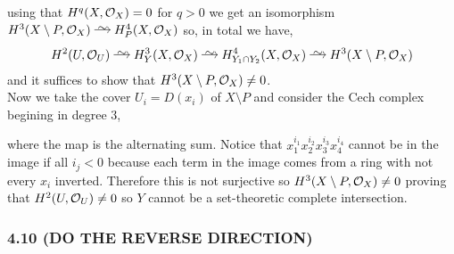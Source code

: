 \documentclass[12pt]{article}
\begin{document}
\begin{center}
\end{center}
using that $H^q(X, \mathcal{O}_{X}) = 0$ for $q > 0$ we get an isomorphism $H^3(X \setminus P, \struct{X}) \iso H^4_P(X, \struct{X})$ so, in total we have, 
\[ H^2(U, \struct{U}) \iso H^3_Y(X, \struct{X}) \iso H^4_{Y_1 \cap Y_2}(X, \struct{X}) \iso H^3(X \setminus P, \struct{X}) \]
and it suffices to show that $H^3(X \setminus P, \mathcal{O}_{X}) \neq 0$.
\bigskip\\
Now we take the cover $U_i = D(x_i)$ of $X \setminus P$ and consider the Cech complex begining in degree $3$,
\begin{center}
\end{center}
where the map is the alternating sum. Notice that $x_1^{i_1} x_2^{i_2} x_3^{i_3} x_4^{i_4}$ cannot be in the image if all $i_j < 0$ because each term in the image comes from a ring with not every $x_i$ inverted. Therefore this is not surjective so $H^3(X \setminus P, \mathcal{O}_{X}) \neq 0$ proving that $H^2(U, \mathcal{O}_{U}) \neq 0$ so $Y$ cannot be a set-theoretic complete intersection. 

\subsubsection{4.10 (DO THE REVERSE DIRECTION)}
\end{document}
